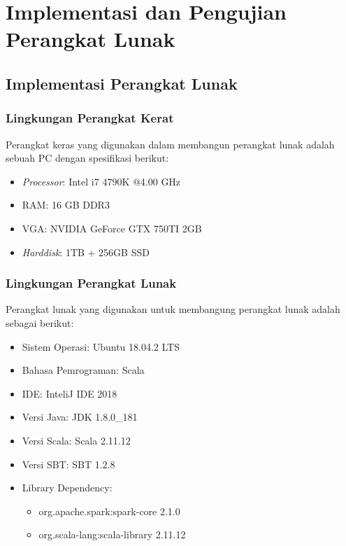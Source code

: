\chapter{Implementasi dan Pengujian Perangkat Lunak}
\label{chap:Implementasi dan Pengujian Perangkat Lunak}

\section{Implementasi Perangkat Lunak}

\subsection{Lingkungan Perangkat Kerat}

Perangkat keras yang digunakan dalam membangun perangkat lunak adalah sebuah PC dengan spesifikasi berikut:

\begin{itemize}
\item \textit{Processor}: Intel i7 4790K @4.00 GHz

\item RAM: 16 GB DDR3

\item VGA: NVIDIA GeForce GTX 750TI 2GB

\item \textit{Harddisk}: 1TB + 256GB SSD 

\end{itemize}

\subsection{Lingkungan Perangkat Lunak}

Perangkat lunak yang digunakan untuk membangung perangkat lunak adalah sebagai berikut:

\begin{itemize}

\item Sistem Operasi: Ubuntu 18.04.2 LTS

\item Bahasa Pemrograman: Scala

\item IDE: InteliJ IDE 2018

\item Versi Java: JDK 1.8.0\_181

\item Versi Scala: Scala 2.11.12

\item Versi SBT: SBT 1.2.8

\item Library Dependency:

\begin{itemize}
\item org.apache.spark:spark-core 2.1.0

\item org.scala-lang:scala-library 2.11.12
\end{itemize}

\end{itemize}


